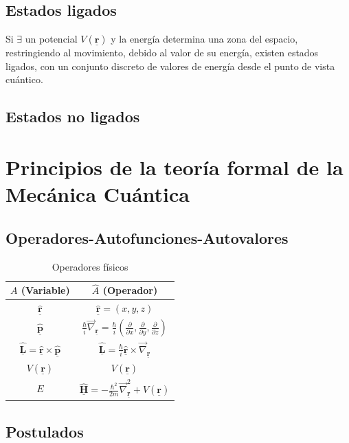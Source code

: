 \documentclass[oneside]{book}
\numberwithin{equation}{section}
\numberwithin{figure}{section}
\numberwithin{table}{section}
\newcommand{\vect}[1]{\underline{\textbf{#1}}}
\begin{document}
				\subsection{Estados ligados}
				
					Si $\exists$ un potencial $V(\vect{r})$ y la energía determina una zona del espacio, restringiendo al movimiento, debido al valor de su energía, existen estados ligados, con un conjunto discreto de valores de energía desde el punto de vista cuántico.
					
				\subsection{Estados no ligados}			
		\section{Principios de la teoría formal de la Mecánica Cuántica}
				\subsection{Operadores-Autofunciones-Autovalores}
				
				\begin{table}[H]
					\begin{center}
						\begin{tabular}{c|c}
							$A$ (Variable) & $\hat{A}$ (Operador) \\ 
						\hline 
							$\hat{\vect{r}}$ & $\hat{\vect{r}}=(x,y,z)$ \\ 
						\hline 
							$\hat{\vect{p}}$ & $\frac{\hbar}{i} \vec{\nabla}_{\vect{r}} =\frac{\hbar}{i}(\frac{\partial}{\partial x},\frac{\partial}{\partial y},\frac{\partial}{\partial z})$ \\
						\hline 
							$\hat{\vect{L}}=\hat{\vect{r}} \times \hat{\vect{p}}$ & $\hat{\vect{L}}=\frac{\hbar}{i} \hat{\vect{r}} \times \vec{\nabla}_{\vect{r}}$ \\ 
						\hline 
							$V(\vect{r})$ & $V(\vect{r})$ \\ 
						\hline 
							$E$ & $\hat{\vect{H}}=-\frac{\hbar^2}{2m}\vec{\nabla}^2_{\vect{r}}+V(\vect{r})$ \\ 
						\end{tabular} 
						\caption{Operadores físicos}
					\end{center}
				\end{table}
				
				\subsection{Postulados}
\end{document}
